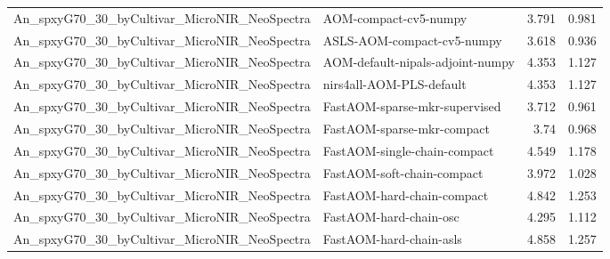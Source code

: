 \begin{landscape}
\begin{longtable}{L{8.0cm}L{9.5cm}rr}
An\_\allowbreak{}spxyG70\_\allowbreak{}30\_\allowbreak{}byCultivar\_\allowbreak{}MicroNIR\_\allowbreak{}NeoSpectra & AOM-\allowbreak{}compact-\allowbreak{}cv5-\allowbreak{}numpy & 3.791 & 0.981 \\
An\_\allowbreak{}spxyG70\_\allowbreak{}30\_\allowbreak{}byCultivar\_\allowbreak{}MicroNIR\_\allowbreak{}NeoSpectra & ASLS-\allowbreak{}AOM-\allowbreak{}compact-\allowbreak{}cv5-\allowbreak{}numpy & 3.618 & 0.936 \\
An\_\allowbreak{}spxyG70\_\allowbreak{}30\_\allowbreak{}byCultivar\_\allowbreak{}MicroNIR\_\allowbreak{}NeoSpectra & AOM-\allowbreak{}default-\allowbreak{}nipals-\allowbreak{}adjoint-\allowbreak{}numpy & 4.353 & 1.127 \\
An\_\allowbreak{}spxyG70\_\allowbreak{}30\_\allowbreak{}byCultivar\_\allowbreak{}MicroNIR\_\allowbreak{}NeoSpectra & nirs4all-\allowbreak{}AOM-\allowbreak{}PLS-\allowbreak{}default & 4.353 & 1.127 \\
An\_\allowbreak{}spxyG70\_\allowbreak{}30\_\allowbreak{}byCultivar\_\allowbreak{}MicroNIR\_\allowbreak{}NeoSpectra & FastAOM-\allowbreak{}sparse-\allowbreak{}mkr-\allowbreak{}supervised & 3.712 & 0.961 \\
An\_\allowbreak{}spxyG70\_\allowbreak{}30\_\allowbreak{}byCultivar\_\allowbreak{}MicroNIR\_\allowbreak{}NeoSpectra & FastAOM-\allowbreak{}sparse-\allowbreak{}mkr-\allowbreak{}compact & 3.74 & 0.968 \\
An\_\allowbreak{}spxyG70\_\allowbreak{}30\_\allowbreak{}byCultivar\_\allowbreak{}MicroNIR\_\allowbreak{}NeoSpectra & FastAOM-\allowbreak{}single-\allowbreak{}chain-\allowbreak{}compact & 4.549 & 1.178 \\
An\_\allowbreak{}spxyG70\_\allowbreak{}30\_\allowbreak{}byCultivar\_\allowbreak{}MicroNIR\_\allowbreak{}NeoSpectra & FastAOM-\allowbreak{}soft-\allowbreak{}chain-\allowbreak{}compact & 3.972 & 1.028 \\
An\_\allowbreak{}spxyG70\_\allowbreak{}30\_\allowbreak{}byCultivar\_\allowbreak{}MicroNIR\_\allowbreak{}NeoSpectra & FastAOM-\allowbreak{}hard-\allowbreak{}chain-\allowbreak{}compact & 4.842 & 1.253 \\
An\_\allowbreak{}spxyG70\_\allowbreak{}30\_\allowbreak{}byCultivar\_\allowbreak{}MicroNIR\_\allowbreak{}NeoSpectra & FastAOM-\allowbreak{}hard-\allowbreak{}chain-\allowbreak{}osc & 4.295 & 1.112 \\
An\_\allowbreak{}spxyG70\_\allowbreak{}30\_\allowbreak{}byCultivar\_\allowbreak{}MicroNIR\_\allowbreak{}NeoSpectra & FastAOM-\allowbreak{}hard-\allowbreak{}chain-\allowbreak{}asls & 4.858 & 1.257 \\

\end{longtable}
\end{landscape}
